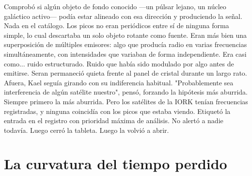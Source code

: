 \documentclass[11pt,a5paper,twoside]{book}
\begin{document}
Comprobó si algún objeto de fondo conocido —un púlsar lejano, un núcleo galáctico activo— podía estar alineado con esa dirección y produciendo la señal. Nada en el catálogo.
Los picos no eran periódicos entre sí de ninguna forma simple, lo cual descartaba un solo objeto rotante como fuente. Eran más bien una superposición de múltiples emisores: algo que producía radio en varias frecuencias simultáneamente, con intensidades que variaban de forma independiente. Era casi como... ruido estructurado. Ruido que había sido modulado por algo antes de emitirse.
Seran permaneció quieta frente al panel de cristal durante un largo rato. Afuera, Kael seguía girando con su indiferencia habitual.
"Probablemente sea interferencia de algún satélite nuestro", pensó, forzando la hipótesis más aburrida. Siempre primero la más aburrida.
Pero los satélites de la IORK tenían frecuencias registradas, y ninguna coincidía con los picos que estaba viendo.
Etiquetó la entrada en el registro con prioridad máxima de análisis. No alertó a nadie todavía.
Luego cerró la tableta. Luego la volvió a abrir.

\chapter{La curvatura del tiempo perdido}
\end{document}
